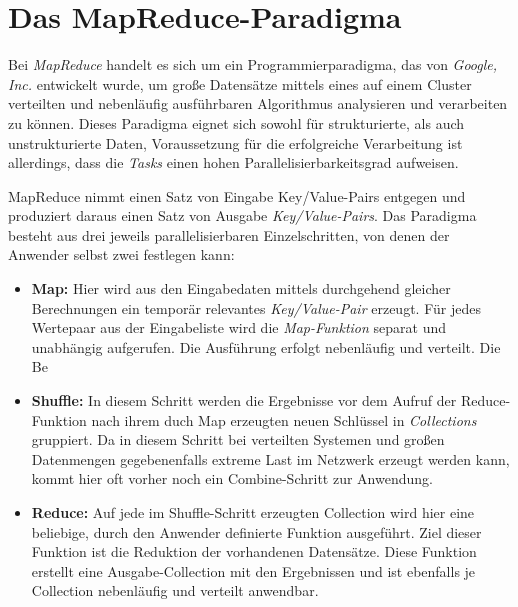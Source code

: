 \section{Das MapReduce-Paradigma}
\label{section:das mapreduce-paradigma}

Bei \textit{MapReduce} handelt es sich um ein Programmierparadigma, das von \textit{Google, Inc.} entwickelt wurde, um große Datensätze mittels eines auf einem Cluster verteilten und nebenläufig ausführbaren Algorithmus analysieren und verarbeiten zu können.  Dieses Paradigma eignet sich sowohl für strukturierte, als auch unstrukturierte Daten, Voraussetzung für die erfolgreiche Verarbeitung ist allerdings, dass die \textit{Tasks} einen hohen Parallelisierbarkeitsgrad aufweisen.  

MapReduce nimmt einen Satz von Eingabe Key/Value-Pairs entgegen und produziert daraus einen Satz von Ausgabe \textit{Key/Value-Pairs}. Das Paradigma besteht aus drei jeweils parallelisierbaren Einzelschritten, von denen der Anwender selbst zwei festlegen kann:

\begin{itemize}

\item \textbf{Map:} Hier wird aus den Eingabedaten mittels durchgehend gleicher Berechnungen ein temporär relevantes \textit{Key/Value-Pair} erzeugt. Für jedes Wertepaar aus der Eingabeliste wird die \textit{Map-Funktion} separat und unabhängig aufgerufen. Die Ausführung erfolgt nebenläufig und verteilt. Die Be

\item \textbf{Shuffle:} In diesem Schritt werden die Ergebnisse vor dem Aufruf der Reduce-Funktion nach ihrem duch Map erzeugten neuen Schlüssel in \textit{Collections} gruppiert. Da in diesem Schritt bei verteilten Systemen und großen Datenmengen gegebenenfalls extreme Last im Netzwerk erzeugt werden kann, kommt hier oft vorher noch ein Combine-Schritt zur Anwendung. 

\item \textbf{Reduce:} Auf jede im Shuffle-Schritt erzeugten Collection wird hier eine beliebige, durch den Anwender definierte Funktion ausgeführt. Ziel dieser Funktion ist die Reduktion der vorhandenen Datensätze. Diese Funktion erstellt eine Ausgabe-Collection mit den Ergebnissen und ist ebenfalls je Collection nebenläufig und verteilt anwendbar.

\end{itemize}




